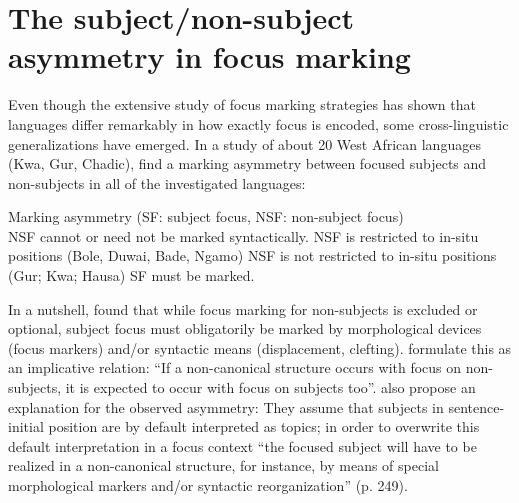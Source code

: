 \documentclass[output=paper,colorlinks,citecolor=brown]{langscibook}
\begin{document}
\section{The subject\slash non-subject asymmetry in focus marking}\label{sec:amaechi:4}

Even though the extensive study of focus marking strategies has shown that languages differ remarkably in how exactly focus is encoded, some cross-linguistic  generalizations have  emerged. In a study of about 20 West African languages (Kwa, Gur, Chadic), \citet{FiedlerEtAl2010} find a marking asymmetry between focused subjects and non-subjects in all of the investigated languages:


\ea%
    \label{ex:amaechi:14} 
    Marking asymmetry \citealt[242,~ex. (11)]{FiedlerEtAl2010} (SF: subject focus, NSF: non-subject focus)\\
    \ea\label{ex:amaechi:14a}
        NSF cannot or need not be marked syntactically.
        \ea\label{ex:amaechi:14ai}
            NSF is restricted to in-situ positions (Bole, Duwai, Bade, Ngamo)
        \ex\label{ex:amaechi:14aii} 
            NSF is not restricted to in-situ positions (Gur; Kwa; Hausa)
        \z
    \ex\label{ex:amaechi:14b}
        SF must be marked.
    \z
\z

In a nutshell, \citet{FiedlerEtAl2010} found that while focus marking for non-subjects is excluded or optional, subject focus must obligatorily be marked by morphological devices (focus markers) and/or syntactic means (displacement, clefting).  \citet[171f]{SkopeteasFanselow2010} formulate this as an implicative relation: ``If a non-canonical structure occurs with focus on non-subjects, it is expected to occur with focus on subjects too''. \citet{FiedlerEtAl2010} also propose an explanation for the observed asymmetry:  They assume that subjects in sentence-initial position are by default interpreted as topics; in order to overwrite this default interpretation in a focus context ``the focused subject will have to be realized in a non-canonical structure, for instance, by means of special morphological markers and/or syntactic reorganization'' (p. 249).
\end{document}
